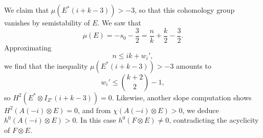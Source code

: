 \documentclass[
	oldfontcommands,
	sumario=abnt-6027-2012,
	12pt,			%
	openright,		%
	oneside,		%
	a4paper,		%
	english,		%
	brazil			%
	]{imecc-unicamp}
\begin{document}
We claim that $\mu(E^*(i+k-3))>-3$, so that this cohomology group vanishes by semistability of $E$. We saw that $$
\mu(E)=-s_0-\frac{3}{2}=\frac{n}{k}+\frac{k}{2}-\frac{3}{2}.
$$
Approximating
$$
n\le ik+w_i',
$$
we find that the inequality $\mu(E^*(i+k-3))>-3$ amounts to 
$$
w_i'\le\binom{k+2}{2}-1,$$
so $H^2(E^*\otimes I_{Z'}(i+k-3))=0$. Likewise, another slope computation shows $H^2(A(-i)\otimes E)=0$, and from $\chi(A(-i)\otimes E)>0$, we deduce $h^0(A(-i)\otimes E)>0.$ In this case $h^0(F\otimes E)\neq 0$, contradicting the acyclicity of $F\otimes E$.\pagebreak


\postextual

\cleardoublepage
{}
{}
\printglossaries
\begin{apendicesenv}
\partapendices

\end{apendicesenv}
\begin{anexosenv}
\partanexos

\end{anexosenv}
\printindex
\end{document}
